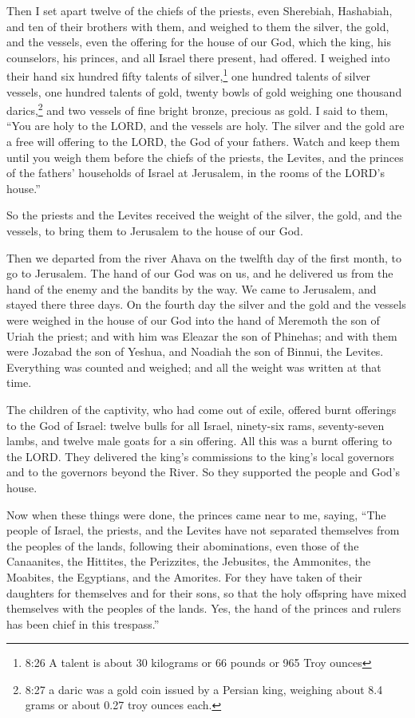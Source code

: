 \myverse{}Then I set apart twelve of the chiefs of the priests, even Sherebiah,
Hashabiah, and ten of their brothers with them,
\myverse{}and weighed to them the silver, the gold, and the vessels, even the offering
for the house of our God, which the king, his counselors, his princes, and all Israel there present, had
offered.
\myverse{}I weighed into their hand six hundred fifty talents of silver,\footnote{8:26 A talent is about 30 kilograms or 66 pounds or 965 Troy ounces} one hundred talents of
silver vessels, one hundred talents of gold,
\myverse{}twenty bowls of gold weighing one thousand darics,\footnote{8:27 a daric was a gold coin issued by a Persian king, weighing about 8.4 grams or about 0.27 troy
	ounces each.} and two vessels of fine bright bronze, precious as gold.
\myverse{}I said to them, “You are holy to the LORD, and the vessels are holy. The silver
and the gold are a free will offering to the LORD, the God of your fathers.
\myverse{}Watch and keep them until you weigh them before the chiefs of the priests,
the Levites, and the princes of the fathers’ households of Israel at Jerusalem, in the rooms of the LORD’s
house.”

\myverse{}So the priests and the Levites received the weight of the silver,
the gold, and the vessels, to bring them to Jerusalem to the house of our God.

\myverse{}Then we departed from the river Ahava on the twelfth day of the
first month, to go to Jerusalem. The hand of our God was on us, and he delivered us from the hand of the
enemy and the bandits by the way.
\myverse{}We came to Jerusalem, and stayed there three days.
\myverse{}On the fourth day the silver and the gold and the vessels were weighed in
the house of our God into the hand of Meremoth the son of Uriah the priest; and with him was Eleazar the
son of Phinehas; and with them were Jozabad the son of Yeshua, and Noadiah the son of Binnui, the Levites.
\myverse{}Everything was counted and weighed; and all the weight was written at that
time.

\myverse{}The children of the captivity, who had come out of exile, offered
burnt offerings to the God of Israel: twelve bulls for all Israel, ninety-six rams, seventy-seven lambs,
and twelve male goats for a sin offering. All this was a burnt offering to the LORD.
\myverse{}They delivered the king’s commissions to the king’s local governors and to
the governors beyond the River. So they supported the people and God’s house.


\mychapter{} \myverse*{}Now when these things were done, the princes came near to me, saying,
“The people of Israel, the priests, and the Levites have not separated themselves from the peoples of
the lands, following their abominations, even those of the Canaanites, the Hittites, the Perizzites, the
Jebusites, the Ammonites, the Moabites, the Egyptians, and the Amorites.
\myverse{}For they have taken of their daughters for themselves and for their sons, so
that the holy offspring have mixed themselves with the peoples of the lands. Yes, the hand of the princes
and rulers has been chief in this trespass.”

